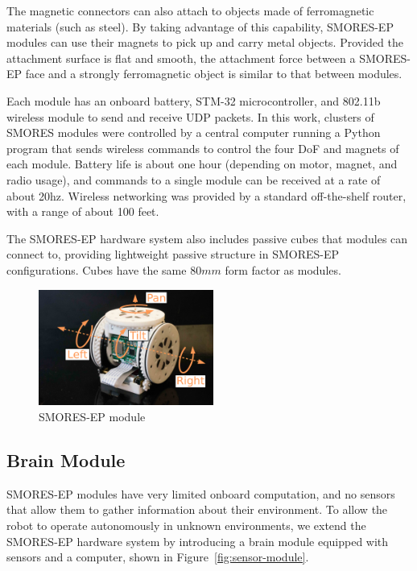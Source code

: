 \documentclass[conference]{IEEEtran}
\begin{document}
The magnetic connectors can also attach to objects made of ferromagnetic
materials (such as steel).  By taking advantage of this capability, SMORES-EP
modules can use their magnets to pick up and carry metal objects.
Provided the attachment surface is flat and smooth, the attachment force
between a SMORES-EP face and a strongly ferromagnetic object is similar to that between modules.

Each module has an onboard battery, STM-32 microcontroller, and 802.11b wireless
module to send and receive UDP packets.  In this work, clusters of SMORES
modules were controlled by a central computer running a Python program that
sends wireless commands to control the four DoF and magnets of each module.
Battery life is about one hour (depending on motor, magnet, and radio usage),
and commands to a single module can be received at a rate of about 20hz.
Wireless networking was provided by a standard off-the-shelf  router, with a
range of about 100 feet.

The SMORES-EP hardware system also includes passive cubes that modules can connect to, providing lightweight passive structure in SMORES-EP configurations.  Cubes have the same $80mm$ form factor as modules.
%
\begin{figure}   
\begin{center}
\includegraphics[height=1.5in]{images/smores_dof.pdf}
\end{center}
\caption{SMORES-EP module}
\label{fig:smores-module}
\vspace{-2em}
\end{figure}
%

\subsection{Brain Module} %
\label{sec:sensor_module}
%
SMORES-EP modules have very limited onboard computation, and no sensors that allow them to gather information about their environment.  To allow the robot to operate autonomously in unknown environments, we extend the SMORES-EP hardware system by introducing a brain module equipped with sensors and a computer, shown in Figure~\ref{fig:sensor-module}.
\end{document}

